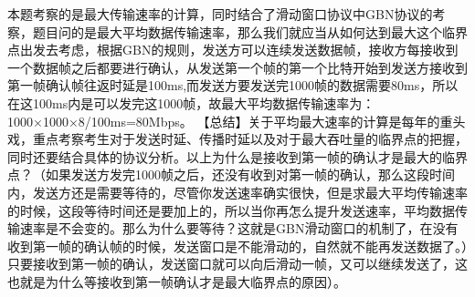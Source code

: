 \begin{solution}本题考察的是最大传输速率的计算，同时结合了滑动窗口协议中GBN协议的考察，题目问的是最大平均数据传输速率，那么我们就应当从如何达到最大这个临界点出发去考虑，根据GBN的规则，发送方可以连续发送数据帧，接收方每接收到一个数据帧之后都要进行确认，从发送第一个帧的第一个比特开始到发送方接收到第一帧确认帧往返时延是100ms,而发送方要发送完1000帧的数据需要80ms，所以在这100ms内是可以发完这1000帧，故最大平均数据传输速率为：1000×1000×8/100ms=80Mbps。
【总结】关于平均最大速率的计算是每年的重头戏，重点考察考生对于发送时延、传播时延以及对于最大吞吐量的临界点的把握，同时还要结合具体的协议分析。以上为什么是接收到第一帧的确认才是最大的临界点？（如果发送方发完1000帧之后，还没有收到对第一帧的确认，那么这段时间内，发送方还是需要等待的，尽管你发送速率确实很快，但是求最大平均传输速率的时候，这段等待时间还是要加上的，所以当你再怎么提升发送速率，平均数据传输速率是不会变的。那么为什么要等待？这就是GBN滑动窗口的机制了，在没有收到第一帧的确认帧的时候，发送窗口是不能滑动的，自然就不能再发送数据了。）只要接收到第一帧的确认，发送窗口就可以向后滑动一帧，又可以继续发送了，这也就是为什么等接收到第一帧确认才是最大临界点的原因）。
\end{solution}
